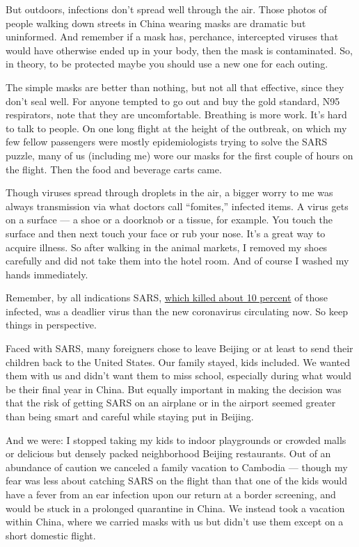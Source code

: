 But outdoors, infections don't spread well through the air. Those photos
of people walking down streets in China wearing masks are dramatic but
uninformed. And remember if a mask has, perchance, intercepted viruses
that would have otherwise ended up in your body, then the mask is
contaminated. So, in theory, to be protected maybe you should use a new
one for each outing.

The simple masks are better than nothing, but not all that effective,
since they don't seal well. For anyone tempted to go out and buy the
gold standard, N95 respirators, note that they are uncomfortable.
Breathing is more work. It's hard to talk to people. On one long flight
at the height of the outbreak, on which my few fellow passengers were
mostly epidemiologists trying to solve the SARS puzzle, many of us
(including me) wore our masks for the first couple of hours on the
flight. Then the food and beverage carts came.

Though viruses spread through droplets in the air, a bigger worry to me
was always transmission via what doctors call ``fomites,'' infected
items. A virus gets on a surface --- a shoe or a doorknob or a tissue,
for example. You touch the surface and then next touch your face or rub
your nose. It's a great way to acquire illness. So after walking in the
animal markets, I removed my shoes carefully and did not take them into
the hotel room. And of course I washed my hands immediately.

Remember, by all indications SARS,
\href{https://www.washingtonpost.com/health/how-the-new-coronavirus-differs-from-sars-measles-and-ebola/2020/01/23/aac6bb06-3e1b-11ea-b90d-5652806c3b3a_story.html}{which
killed about 10 percent} of those infected, was a deadlier virus than
the new coronavirus circulating now. So keep things in perspective.

Faced with SARS, many foreigners chose to leave Beijing or at least to
send their children back to the United States. Our family stayed, kids
included. We wanted them with us and didn't want them to miss school,
especially during what would be their final year in China. But equally
important in making the decision was that the risk of getting SARS on an
airplane or in the airport seemed greater than being smart and careful
while staying put in Beijing.

And we were: I stopped taking my kids to indoor playgrounds or crowded
malls or delicious but densely packed neighborhood Beijing restaurants.
Out of an abundance of caution we canceled a family vacation to Cambodia
--- though my fear was less about catching SARS on the flight than that
one of the kids would have a fever from an ear infection upon our return
at a border screening, and would be stuck in a prolonged quarantine in
China. We instead took a vacation within China, where we carried masks
with us but didn't use them except on a short domestic flight.

